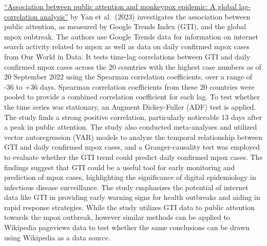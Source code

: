 \documentclass[
  12pt,
]{article}
\begin{document}
\href{https://doi.org/10.1002\%2Fjmv.28382}{``Association between public
attention and monkeypox epidemic: A global lag-correlation analysis''}
by Yan et al.~(2023) investigates the association between public
attention, as measured by Google Trends Index (GTI), and the global mpox
oubtreak. The authors use Google Trends data for information on internet
search activity related to mpox as well as data on daily confirmed mpox
cases from Our World in Data. It tests time-lag correlations between GTI
and daily confirmed mpox cases across the 20 countries with the highest
case numbers as of 20 September 2022 using the Spearman correlation
coefficients, over a range of -36 to +36 days. Spearman correlation
coefficients from these 20 countries were pooled to provide a combined
correlation coefficient for each lag. To test whether the time series
was stationary, an Augment Dickey-Fuller (ADF) test is applied. The
study finds a strong positive correlation, particularly noticeable 13
days after a peak in public attention. The study also conducted
meta-analyses and utilized vector autoregression (VAR) models to analyze
the temporal relationship between GTI and daily confirmed mpox cases,
and a Granger-causality test was employed to evaluate whether the GTI
trend could predict daily confirmed mpox cases. The findings suggest
that GTI could be a useful tool for early monitoring and prediction of
mpox cases, highlighting the significance of digital epidemiology in
infectious disease surveillance. The study emphasizes the potential of
internet data like GTI in providing early warning signs for health
outbreaks and aiding in rapid response strategies. While the study
utilizes GTI data to public attention towards the mpox outbreak, however
similar methods can be applied to Wikipedia pageviews data to test
whether the same conclusions can be drawn using Wikipedia as a data
source.
\end{document}
